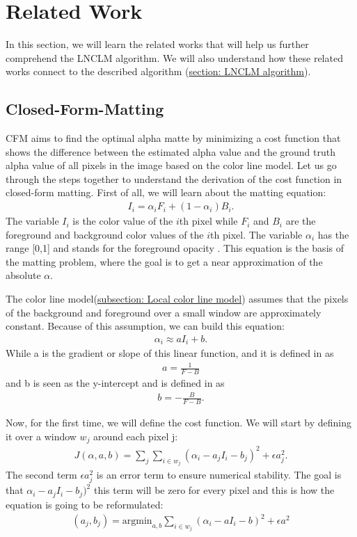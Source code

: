 \section{Related Work}
In this section, we will learn the related works that will help us further comprehend the LNCLM algorithm. We will also understand how these related works connect to the described algorithm (\hyperref[sec:algorithm]{section: LNCLM algorithm}).
\subsection{Closed-Form-Matting}
\label{sec:closedform}
CFM aims to find the optimal alpha matte by minimizing a cost function that shows the difference between the estimated alpha value and the ground truth alpha value of all pixels in the image based on the color line model.
Let us go through the steps together to understand the derivation of the cost function in closed-form matting.
First of all, we will learn about the matting equation: 
\begin{align} \label{eq:3}
	I_i  = \alpha_iF_i + (1-\alpha_i)B_i . 
\end{align} 
The variable \(I_i\) is the color value of the \(i\)th pixel while \(F_i\) and \(B_i\) are the foreground and background color values of the \(i\)th pixel. The variable \(\alpha_i\) has the range [0,1] and stands for the foreground opacity \cite{cf}. This equation is the basis of the matting problem, where the goal is to get a near approximation of the absolute \(\alpha\).

The color line model(\hyperref[sec:localcolor]{subsection: Local color line model}) assumes that the pixels of the background and foreground over a small window are approximately constant. Because of this assumption, we can build this equation: 
\begin{align}  \label{eq:4}
	\alpha_i \approx a I_i + b .
\end{align}
While a is the gradient or slope of this linear function, and it is defined in \cite{cf} as
\begin{align}
	a  = \frac{1}{F-B}
\end{align}  
and b is seen as the y-intercept and is defined in \cite{cf} as
\begin{align}
	b  = -\frac{B}{F-B}.
\end{align}  

Now, for the first time, we will define the cost function. We will start by defining it over a window \(w_j\) around each pixel j: 
\begin{align}
	J(\alpha, a, b) = \sum_{j} \sum_{i \in w_j} (\alpha_i - a_j I_i - b_j)^2 + \epsilon a^2_j .
\end{align}  
The second term \(\epsilon a^2_j \) is an error term to ensure numerical stability. The goal is that \(\alpha_i - a_j I_i - b_j)^2 \) this term will be zero for every pixel and this is how the equation is going to be reformulated: 
\begin{align}
	(a_j, b_j) = \text{argmin}_{a,b} \sum_{i \in w_j} (\alpha_i - a I_i - b)^2 + \epsilon a^2
\end{align}  

